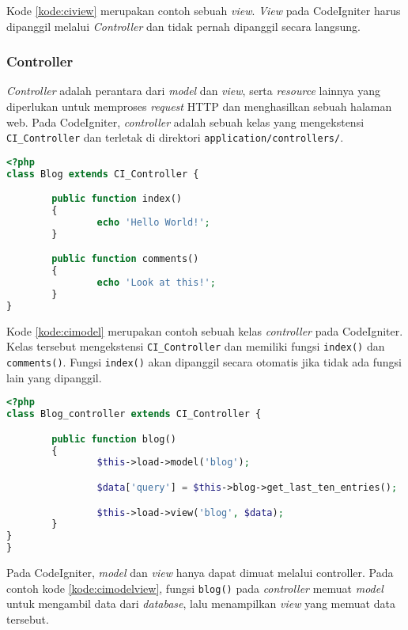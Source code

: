 Kode \ref{kode:ciview} merupakan contoh sebuah \textit{view}. \textit{View} pada CodeIgniter harus dipanggil melalui \textit{Controller} dan tidak pernah dipanggil secara langsung.
	
\subsubsection{Controller}
\textit{Controller} adalah perantara dari \textit{model} dan \textit{view}, serta \textit{resource} lainnya yang diperlukan untuk memproses \textit{request} HTTP dan menghasilkan sebuah halaman web. Pada CodeIgniter, \textit{controller} adalah sebuah kelas yang mengekstensi \verb|CI_Controller| dan terletak di direktori \verb|application/controllers/|.

\begin{lstlisting}[language=php, caption=Contoh \textit{controller}, label=kode:cicontroller]
<?php
class Blog extends CI_Controller {

        public function index()
        {
                echo 'Hello World!';
        }

        public function comments()
        {
                echo 'Look at this!';
        }
}
\end{lstlisting}

Kode \ref{kode:cimodel} merupakan contoh sebuah kelas \textit{controller} pada CodeIgniter. Kelas tersebut mengekstensi \verb|CI_Controller| dan memiliki fungsi \verb|index()| dan \verb|comments()|. Fungsi \verb|index()| akan dipanggil secara otomatis jika tidak ada fungsi lain yang dipanggil. 

\begin{lstlisting}[language=php, caption=Contoh memuat \textit{model} dan menampilkan \textit{view}, label=kode:cimodelview]
<?php
class Blog_controller extends CI_Controller {

        public function blog()
        {
                $this->load->model('blog');

                $data['query'] = $this->blog->get_last_ten_entries();

                $this->load->view('blog', $data);
        }
}
}
\end{lstlisting}

Pada CodeIgniter, \textit{model} dan \textit{view} hanya dapat dimuat melalui controller. Pada contoh kode \ref{kode:cimodelview}, fungsi \verb|blog()| pada \textit{controller} memuat \textit{model} untuk mengambil data dari \textit{database}, lalu menampilkan \textit{view} yang memuat data tersebut. 

